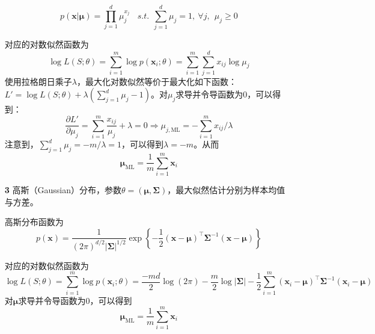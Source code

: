 \documentclass{article}
\begin{document}
\begin{itemize}
\begin{scriptsize}
\begin{spacing}{1.2}
{	\begin{equation*}
	p(\bm{x}|\bm{\mu}) = \prod_{j=1}^d \mu_j^{x_j}\ \ \ \ \mathit{s.t.}\ \ \sum_{j=1}^d \mu_j=1,\ \forall j,\ \ \mu_j\geq 0
	\end{equation*}

	对应的对数似然函数为
	\begin{equation*}
	\log L(S;\theta) = \sum_{i=1}^m \log p(\bm{x}_i;\theta) = \sum_{i=1}^m \sum_{j=1}^d x_{ij} \log \mu_j
	\end{equation*}
使用拉格朗日乘子$\lambda$，最大化对数似然等价于最大化如下函数：$L' = \log L(S;\theta) + \lambda \left( \sum_{j=1}^d \mu_j - 1 \right) $。对$\mu_j$求导并令导函数为0，可以得到：
	\begin{equation*}
	\frac{\partial L'}{\partial \mu_j} = \sum_{i=1}^m\frac{x_{ij}}{\mu_j} + \lambda = 0  \Longrightarrow	 \mu_{j,\mathrm{ML}} = -\sum_{i=1}^m x_{ij}/\lambda
	\end{equation*}
注意到，$\sum_{j=1}^d \mu_j=-m/\lambda=1$，可以得到$\lambda=-m$。从而
	\begin{equation*}
	\bm{\mu}_{\mathrm{ML}} = \frac{1}{m}\sum_{i=1}^m \bm{x}_i
	\end{equation*}
	}
	\end{spacing}
	\end{scriptsize}
	\vspace{-4mm}
	
	\item [\textbf{3}] 高斯（Gaussian）分布，参数$\theta=(\bm{\mu},\bm{\Sigma})$，最大似然估计分别为样本均值与方差。
	\vspace{1mm}
	\begin{scriptsize}
	\begin{spacing}{1.2}
	{\sffamily
	高斯分布函数为
	\begin{equation*}
	p(\bm{x}) = \frac{1}{(2\pi)^{d/2} |\bm{\Sigma}|^{1/2}} \exp \left\{ -\frac{1}{2} (\bm{x} - \bm{\mu})^\top \bm{\Sigma}^{-1} (\bm{x} - \bm{\mu})\right\}
	\end{equation*}
	
	对应的对数似然函数为
	\begin{equation*}
	\log L(S;\theta) = \sum_{i=1}^m \log p(\bm{x}_i;\theta) 
	= \frac{-md}{2} \log (2\pi) - \frac{m}{2}\log |\bm{\Sigma}| - \frac{1}{2} \sum_{i=1}^m (\bm{x}_i - \bm{\mu})^\top \bm{\Sigma}^{-1} (\bm{x}_i - \bm{\mu})
	\end{equation*}
	对$\bm{\mu}$求导并令导函数为0，可以得到
	\begin{equation*}
	\bm{\mu}_{\mathrm{ML}}= \frac{1}{m} \sum_{i=1}^m \bm{x}_i
	\end{equation*}
	
}
\end{spacing}
\end{scriptsize}
\end{itemize}
\end{document}
